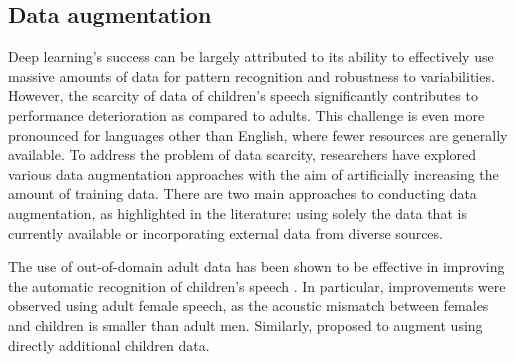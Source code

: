 \subsection{Data augmentation}%
Deep learning's success can be largely attributed to its ability to effectively use massive amounts of data for pattern recognition and robustness to variabilities. However, the scarcity of data of children's speech significantly contributes to performance deterioration as compared to adults. This challenge is even more pronounced for languages other than English, where fewer resources are generally available. To address the problem of data scarcity, researchers have explored various data augmentation approaches with the aim of artificially increasing the amount of training data. There are two main approaches to conducting data augmentation, as highlighted in the literature: using solely the data that is currently available or incorporating external data from diverse sources.

The use of out-of-domain adult data has been shown to be effective in improving the automatic recognition of children's speech \cite{adultAUGMENT1, adultAUGMENT2}. In particular, improvements were observed using adult female speech, as the acoustic mismatch between females and children is smaller than adult men.
Similarly, \cite{nonnative} proposed to augment using directly additional children data.

